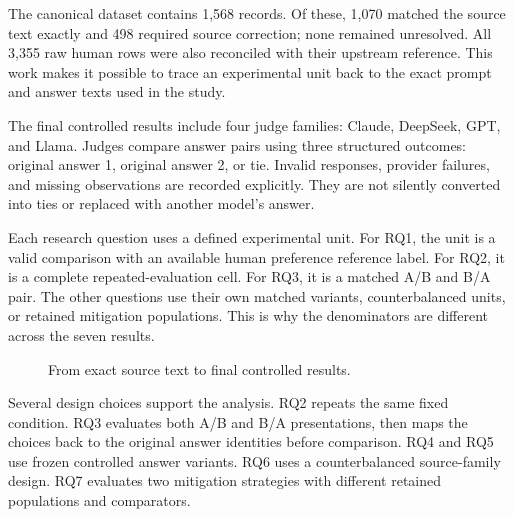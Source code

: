\documentclass[11pt,a4paper]{article}
\begin{document}
The canonical dataset contains 1,568 records. Of these, 1,070 matched the source text exactly and 498 required source correction; none remained unresolved. All 3,355 raw human rows were also reconciled with their upstream reference. This work makes it possible to trace an experimental unit back to the exact prompt and answer texts used in the study.

The final controlled results include four judge families: Claude, DeepSeek, GPT, and Llama. Judges compare answer pairs using three structured outcomes: original answer 1, original answer 2, or tie. Invalid responses, provider failures, and missing observations are recorded explicitly. They are not silently converted into ties or replaced with another model's answer.

Each research question uses a defined experimental unit. For RQ1, the unit is a valid comparison with an available human preference reference label. For RQ2, it is a complete repeated-evaluation cell. For RQ3, it is a matched A/B and B/A pair. The other questions use their own matched variants, counterbalanced units, or retained mitigation populations. This is why the denominators are different across the seven results.

\begin{figure}[H]
\centering
{}
\caption{From exact source text to final controlled results.}
\end{figure}

Several design choices support the analysis. RQ2 repeats the same fixed condition. RQ3 evaluates both A/B and B/A presentations, then maps the choices back to the original answer identities before comparison. RQ4 and RQ5 use frozen controlled answer variants. RQ6 uses a counterbalanced source-family design. RQ7 evaluates two mitigation strategies with different retained populations and comparators.
\end{document}
